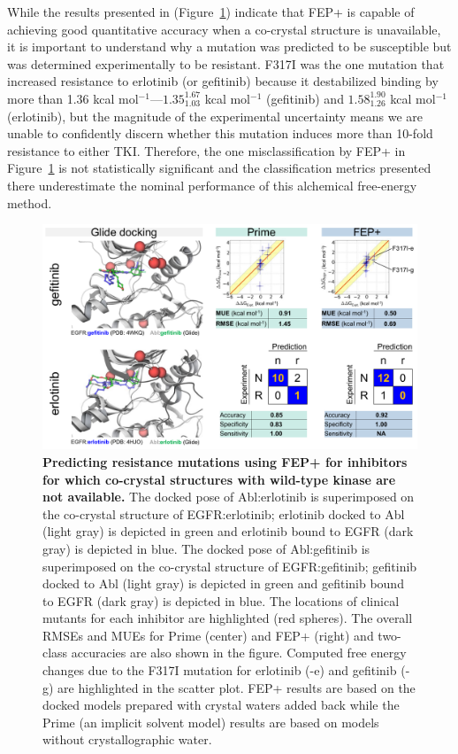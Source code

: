 \documentclass[phd,tocprelim]{cornell}
\begin{document}
 While the results presented in (Figure~\ref{fig:abl-figure5}) indicate that FEP+ is capable of achieving good quantitative accuracy when a co-crystal structure is unavailable, it is important to understand why a mutation was predicted to be susceptible but was determined experimentally to be resistant.
F317I was the one mutation that increased resistance to erlotinib (or gefitinib) because it destabilized binding by more than 1.36 kcal mol$^{-1}$---$1.35^{1.67}_{1.03}$ kcal mol$^{-1}$ (gefitinib) and $1.58^{1.90}_{1.26}$ kcal mol$^{-1}$ (erlotinib), but the magnitude of the experimental uncertainty means we are unable to confidently discern whether this mutation induces more than 10-fold resistance to either TKI.
Therefore, the one misclassification by FEP+ in Figure~\ref{fig:abl-figure5} is not statistically significant and the classification metrics presented there underestimate the nominal performance of this alchemical free-energy method.

\begin{landscape}
	\begin{figure}[p]
		\centering
		\includegraphics[width=0.8\linewidth]{figures/abl-figure-5.pdf}
		\caption[Predicting resistance mutations using FEP+ for inhibitors for which co-crystal structures with wild-type kinase are not available.]{
			{\bf Predicting resistance mutations using FEP+ for inhibitors for which co-crystal structures with wild-type kinase are not available.}
			The docked pose of Abl:erlotinib is superimposed on the co-crystal structure of EGFR:erlotinib; erlotinib docked to Abl (light gray) is depicted in green and erlotinib bound to EGFR (dark gray) is depicted in blue. 
			The docked pose of Abl:gefitinib is superimposed on the co-crystal structure of EGFR:gefitinib; gefitinib docked to Abl (light gray) is depicted in green and gefitinib bound to EGFR (dark gray) is depicted in blue. The locations of clinical mutants for each inhibitor are highlighted (red spheres).
			The overall RMSEs and MUEs for Prime (center) and FEP+ (right) and two-class accuracies are also shown in the figure.
			Computed free energy changes due to the F317I mutation for erlotinib (-e) and gefitinib (-g) are highlighted in the scatter plot.
			FEP+ results are based on the docked models prepared with crystal waters added back while the Prime (an implicit solvent model) results are based on models without crystallographic water.
		}
		\label{fig:abl-figure5}
	\end{figure}
\end{landscape}
\end{document}
